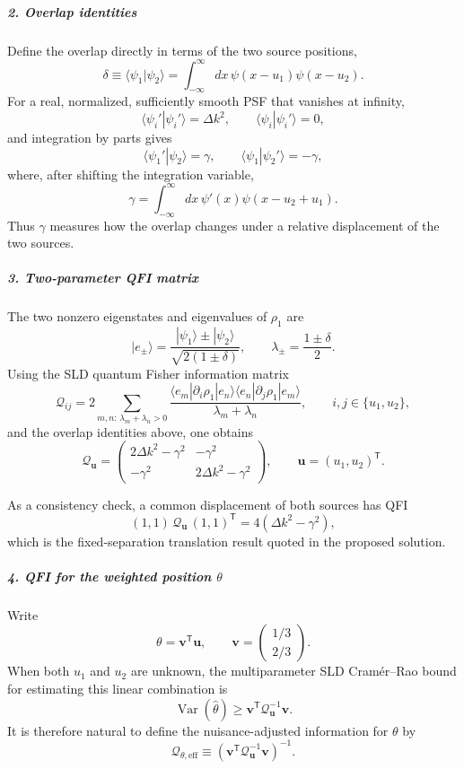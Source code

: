{\color{blue}
\subparagraph*{2. Overlap identities}

Define the overlap directly in terms of the two source positions,
\[
\delta\equiv\langle\psi_1|\psi_2\rangle
=\int_{-\infty}^{\infty}dx\,\psi(x-u_1)\psi(x-u_2).
\]
For a real, normalized, sufficiently smooth PSF that vanishes at infinity,
\[
\langle\psi_i'|\psi_i'\rangle=\Delta k^2,
\qquad
\langle\psi_i|\psi_i'\rangle=0,
\]
and integration by parts gives
\[
\langle\psi_1'|\psi_2\rangle=\gamma,
\qquad
\langle\psi_1|\psi_2'\rangle=-\gamma,
\]
where, after shifting the integration variable,
\[
\gamma=\int_{-\infty}^{\infty}dx\,\psi'(x)\psi(x-u_2+u_1).
\]
Thus $\gamma$ measures how the overlap changes under a relative displacement of the two sources.

\subparagraph*{3. Two-parameter QFI matrix}

The two nonzero eigenstates and eigenvalues of $\rho_1$ are
\[
|e_\pm\rangle=
\frac{|\psi_1\rangle\pm|\psi_2\rangle}
{\sqrt{2(1\pm\delta)}},
\qquad
\lambda_\pm=\frac{1\pm\delta}{2}.
\]
Using the SLD quantum Fisher information matrix
\[
\mathcal Q_{ij}
=
2\sum_{m,n:\,\lambda_m+\lambda_n>0}
\frac{
\langle e_m|\partial_i\rho_1|e_n\rangle
\langle e_n|\partial_j\rho_1|e_m\rangle
}
{\lambda_m+\lambda_n},
\qquad i,j\in\{u_1,u_2\},
\]
and the overlap identities above, one obtains
\[
\boxed{
\mathcal Q_{\boldsymbol u}
=
\begin{pmatrix}
2\Delta k^2-\gamma^2 & -\gamma^2\\[3pt]
-\gamma^2 & 2\Delta k^2-\gamma^2
\end{pmatrix}},
\qquad
\boldsymbol u=(u_1,u_2)^\mathsf T.
\]

As a consistency check, a common displacement of both sources has QFI
\[
(1,1)\,\mathcal Q_{\boldsymbol u}\,(1,1)^\mathsf T
=4(\Delta k^2-\gamma^2),
\]
which is the fixed-separation translation result quoted in the proposed solution.

\subparagraph*{4. QFI for the weighted position $\theta$}

Write
\[
\theta=\boldsymbol v^\mathsf T\boldsymbol u,
\qquad
\boldsymbol v=
\begin{pmatrix}
1/3\\[2pt]
2/3
\end{pmatrix}.
\]
When both $u_1$ and $u_2$ are unknown, the multiparameter SLD Cram\'er--Rao bound for estimating this linear combination is
\[
\operatorname{Var}(\hat\theta)
\ge
\boldsymbol v^\mathsf T
\mathcal Q_{\boldsymbol u}^{-1}
\boldsymbol v.
\]
It is therefore natural to define the nuisance-adjusted information for $\theta$ by
\[
\mathcal Q_{\theta,\mathrm{eff}}
\equiv
\left(
\boldsymbol v^\mathsf T
\mathcal Q_{\boldsymbol u}^{-1}
\boldsymbol v
\right)^{-1}.
\]

}
